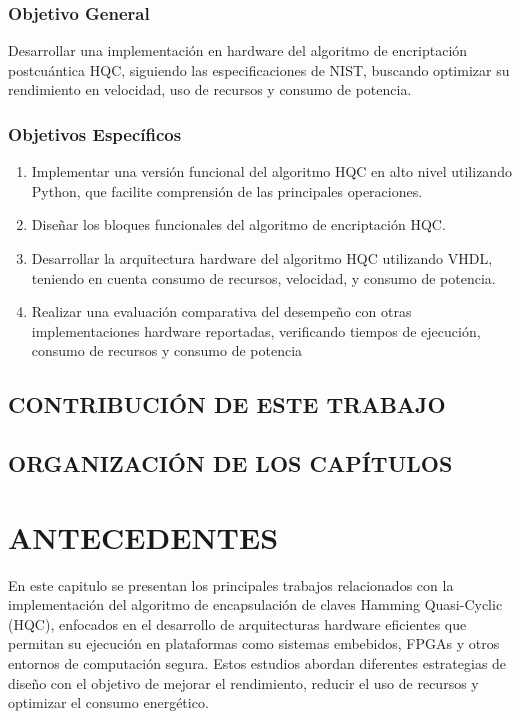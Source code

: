 \subsection{Objetivo General}
Desarrollar una implementación en hardware del algoritmo de encriptación postcuántica HQC, siguiendo las especificaciones de NIST, buscando optimizar su rendimiento en velocidad, uso de recursos y consumo de potencia.

\subsection{Objetivos Específicos}
\begin{enumerate}

    \item Implementar una versión funcional del algoritmo HQC en alto nivel utilizando Python, que facilite comprensión de las principales operaciones.

    \item Diseñar los bloques funcionales del algoritmo de encriptación HQC.

    \item Desarrollar la arquitectura hardware del algoritmo HQC utilizando VHDL, teniendo en cuenta consumo de recursos, velocidad, y consumo de potencia.

    \item Realizar una evaluación comparativa del desempeño con otras implementaciones hardware reportadas, verificando tiempos de ejecución, consumo de recursos y consumo de potencia

\end{enumerate}

\section{CONTRIBUCIÓN DE ESTE TRABAJO} 

\section{ORGANIZACIÓN DE LOS CAPÍTULOS} 


\newpage

\chapter{ANTECEDENTES}
En este capitulo se presentan los principales trabajos relacionados con la implementación del algoritmo de encapsulación de claves Hamming Quasi-Cyclic (HQC), enfocados en el desarrollo de arquitecturas hardware eficientes que permitan su ejecución en plataformas como sistemas embebidos, FPGAs y otros entornos de computación segura. Estos estudios abordan diferentes estrategias de diseño con el objetivo de mejorar el rendimiento, reducir el uso de recursos y optimizar el consumo energético.

